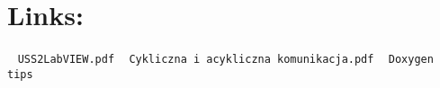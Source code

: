 \section{Links\+:}\label{referenced_documents_links_sec}
~\newline
 {\tt U\+S\+S2\+Lab\+V\+I\+E\+W.\+pdf} ~\newline
 {\tt Cykliczna i acykliczna komunikacja.\+pdf} ~\newline
 {\tt Doxygen tips} 